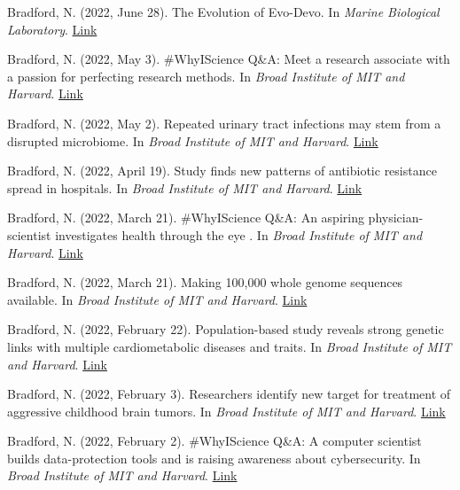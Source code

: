 \documentclass[margin, 10pt]{res} %
\begin{document}
\begin{resume}
Bradford, N. (2022, June 28). The Evolution of Evo-Devo. In {\sl Marine Biological Laboratory}. \href{https://www.mbl.edu/news/evolution-evo-devo}{Link}

Bradford, N. (2022, May 3). \#WhyIScience Q\&A: Meet a research associate with a passion for perfecting research methods. In {\sl Broad Institute of MIT and Harvard}. \href{https://www.broadinstitute.org/blog/whyiscience-qa-meet-research-associate-passion-perfecting-research-methods}{Link}

Bradford, N. (2022, May 2). Repeated urinary tract infections may stem from a disrupted microbiome. In {\sl Broad Institute of MIT and Harvard}. \href{https://www.broadinstitute.org/news/repeated-urinary-tract-infections-may-stem-disrupted-microbiome}{Link}


Bradford, N. (2022, April 19). Study finds new patterns of antibiotic resistance spread in hospitals. In {\sl Broad Institute of MIT and Harvard}. \href{https://www.broadinstitute.org/news/study-finds-new-patterns-antibiotic-resistance-spread-hospitals}{Link}

Bradford, N. (2022, March 21). \#WhyIScience Q\&A: An aspiring physician-scientist investigates health through the eye
. In {\sl Broad Institute of MIT and Harvard}. \href{https://www.broadinstitute.org/blog/whyiscience-qa-aspiring-physician-scientist-investigates-health-through-eye}{Link}

Bradford, N. (2022, March 21). Making 100,000 whole genome sequences available. In {\sl Broad Institute of MIT and Harvard}. \href{https://www.broadinstitute.org/news/making-100000-whole-genome-sequences-available}{Link}


Bradford, N. (2022, February 22). Population-based study reveals strong genetic links with multiple cardiometabolic diseases and traits. In {\sl Broad Institute of MIT and Harvard}. \href{https://www.broadinstitute.org/news/population-based-study-reveals-strong-genetic-links-multiple-cardiometabolic-diseases-and-0}{Link}

Bradford, N. (2022, February 3). Researchers identify new target for treatment of aggressive childhood brain tumors. In {\sl Broad Institute of MIT and Harvard}. \href{https://www.broadinstitute.org/news/researchers-identify-new-target-treatment-aggressive-childhood-brain-tumors}{Link}

Bradford, N. (2022, February 2). \#WhyIScience Q\&A: A computer scientist builds data-protection tools and is raising awareness about cybersecurity. In {\sl Broad Institute of MIT and Harvard}. \href{https://www.broadinstitute.org/blog/whyiscience-qa-computer-scientist-builds-data-protection-tools-and-raising-awareness-about}{Link}


\end{resume}
\end{document}
